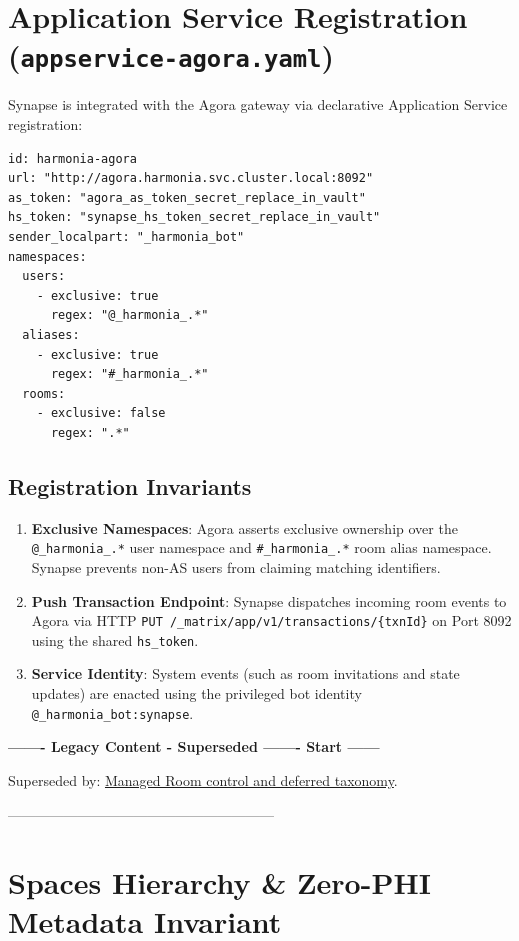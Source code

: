 \section{Application Service Registration (\texttt{appservice-agora.yaml})}

Synapse is integrated with the Agora gateway via declarative Application Service registration:
\begin{lstlisting}[caption={Agora Matrix Application Service Registration Manifest}]
id: harmonia-agora
url: "http://agora.harmonia.svc.cluster.local:8092"
as_token: "agora_as_token_secret_replace_in_vault"
hs_token: "synapse_hs_token_secret_replace_in_vault"
sender_localpart: "_harmonia_bot"
namespaces:
  users:
    - exclusive: true
      regex: "@_harmonia_.*"
  aliases:
    - exclusive: true
      regex: "#_harmonia_.*"
  rooms:
    - exclusive: false
      regex: ".*"
\end{lstlisting}

\subsection{Registration Invariants}
\begin{enumerate}
    \item \textbf{Exclusive Namespaces}: Agora asserts exclusive ownership over the \nolinkurl{@_harmonia_.*} user namespace and \nolinkurl{#_harmonia_.*} room alias namespace. Synapse prevents non-AS users from claiming matching identifiers.
    \item \textbf{Push Transaction Endpoint}: Synapse dispatches incoming room events to Agora via HTTP \nolinkurl{PUT /_matrix/app/v1/transactions/{txnId}} on Port 8092 using the shared \nolinkurl{hs_token}.
    \item \textbf{Service Identity}: System events (such as room invitations and state updates) are enacted using the privileged bot identity \nolinkurl{@_harmonia_bot:synapse}.
\end{enumerate}


\par\noindent\textbf{------- Legacy Content - Superseded ------- Start ------}
\par\noindent Superseded by: \href{../../markdown/05-information-systems-architecture/agora-omilia-collaboration.md\#control-and-operations}{Managed Room control and deferred taxonomy}.
\par\noindent ---------------------------------------------------------

\section{Spaces Hierarchy \& Zero-PHI Metadata Invariant}

